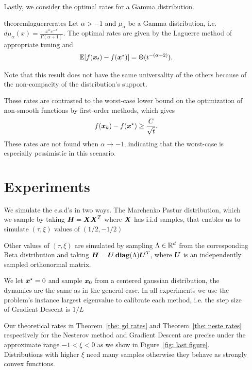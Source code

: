 \documentclass{article}
\begin{document}
Lastly, we consider the optimal rates for a Gamma distribution.

\begin{restatable}{theorem}{laguerrerates}
Let $\alpha>-1$ and $\mu_\alpha$ be a Gamma distribution, i.e. $d\mu_\alpha(x)=\frac{x^\alpha e^{-x}}{\Gamma(\alpha+1)}$. The optimal rates are given by the Laguerre method of appropriate tuning and
\begin{equation}
    \mathbb{E}[f({\boldsymbol x}_t)-f({\boldsymbol x}^\star)]=\Theta(t^{-(\alpha+2)}) . 
\end{equation}
\end{restatable}
Note that this result does not have the same universality of the others because of the non-compacity of the distribution's support.

These rates are contrasted  to the worst-case lower bound on the optimization of non-smooth functions by first-order methods, which gives
\begin{equation*}
    f({\boldsymbol x}_k)-f({\boldsymbol x}^\star)\geq\frac{C}{\sqrt{t}} .
\end{equation*}
These rates are not found when $\alpha\rightarrow-1$, indicating that the worst-case is especially pessimistic in this scenario.


\section{Experiments}

We simulate the e.s.d's  in two ways. The Marchenko Pastur distribution, which we sample by taking ${\boldsymbol H}={\boldsymbol X}{\boldsymbol X}^T$ where ${\boldsymbol X}$ has i.i.d samples, that enables us to simulate $(\tau,\xi)$ values of $(1/2,-1/2)$ 

Other values of $(\tau,\xi)$ are simulated by sampling $\Lambda \in {\mathbb R}^d$ from the corresponding Beta distribution and taking ${\boldsymbol H}={\boldsymbol U}\operatorname*{\mathbf{diag}}(\Lambda){\boldsymbol U}^T$, where ${\boldsymbol U}$ is an independently sampled orthonormal matrix. 

We let ${\boldsymbol x}^\star=0$ and sample ${\boldsymbol x}_0$ from a centered gaussian distribution, the dynamics are the same as in the general case. In all experiments we use the problem's instance largest eigenvalue to calibrate each method, i.e. the step size of Gradient Descent is $1/L$



Our theoretical rates in Theorem~\ref{the: gd rates} and Theorem~\ref{the: neste rates} respectively for the Nesterov method and Gradient Descent are precise under the approximate range $-1<\xi<0$  as we show in Figure~\ref{fig: last figure}. Distributions with higher $\xi$ need many samples otherwise they behave as strongly convex functions.
\end{document}
